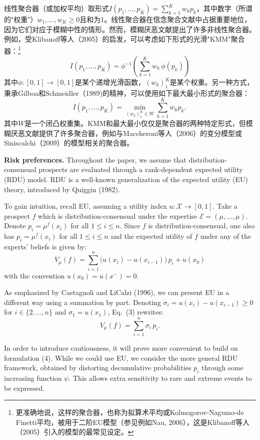 \documentclass[12pt,a4paper]{article}
\newenvironment{original}
  {\par\noindent\ignorespaces}
  {\par}
\newenvironment{translation}
  {\par\noindent{\color{transblue}\ignorespaces}}
  {\par\medskip}
\begin{document}
\begin{translation}
线性聚合器（或加权平均）取形式$I(p_{1}, \dots, p_{K}) = \sum_{k=1}^{K} w_{k} p_{k}$，其中数字（所谓的"权重"）$w_{1}, \dots, w_{K} \geq 0$且和为1。线性聚合器在信念聚合文献中占据重要地位，因为它们对应于模糊中性的情形。然而，模糊厌恶文献提出了许多非线性聚合器。例如，受Klibanoff等人（2005）的启发，可以考虑如下形式的光滑"KMM"聚合器：\footnote{更准确地说，这样的聚合器，也称为拟算术平均或Kolmogorov-Nagumo-de Finetti平均，被用于二阶EU模型（参见例如Nau, 2006），这是Klibanoff等人（2005）引入的模型的最常见设定。}
\[
I(p_{1}, \dots, p_{K}) = \phi^{-1}\!\left( \sum_{k=1}^{K} w_{k} \, \phi(p_{k}) \right) \tag{1}
\]
其中$\phi: [0,1] \to [0,1]$是某个递增光滑函数，$(w_{k})_{1}^{K}$是某个权重。另一种方式，秉承Gilboa和Schmeidler（1989)的精神，可以使用如下最大最小形式的聚合器：
\[
I(p_{1}, \dots, p_{K}) = \min_{(w_{k})_{1}^{K} \in W} \sum_{k=1}^{K} w_{k} p_{k}, \tag{2}
\]
其中$W$是一个闭凸权重集。KMM和最大最小仅仅是聚合器的两种特定形式，但模糊厌恶文献提供了许多聚合器，例如与Maccheroni等人（2006）的变分模型或Siniscalchi（2009）的模型相关的聚合器。
\end{translation}

\begin{original}
\textbf{Risk preferences.} Throughout the paper, we assume that distribution-consensual prospects are evaluated through a rank-dependent expected utility (RDU) model. RDU is a well-known generalization of the expected utility (EU) theory, introduced by Quiggin (1982).

To gain intuition, recall EU, assuming a utility index $u: \mathcal{X} \to [0,1]$. Take a prospect $f$ which is distribution-consensual under the expertise $\mathcal{E} = (\mu, \dots, \mu)$. Denote $p_{i} = \mu^{f}(x_{i})$ for all $1 \leq i \leq n$. Since $f$ is distribution-consensual, one also has $p_{i} = \mu^{f}(x_{i})$ for all $1 \leq i \leq n$ and the expected utility of $f$ under any of the experts' beliefs is given by:
\[
V_{\mu}(f) = \sum_{i=1}^{n} \big(u(x_{i}) - u(x_{i-1})\big) \, p_{i} + u(x_{0}) \tag{3}
\]
with the convention $u(x_{0}) = u(x^{-}) = 0$.

As emphasized by Castagnoli and LiCalzi (1996), we can present EU in a different way using a summation by part. Denoting $\sigma_{i} = u(x_{i}) - u(x_{i-1}) \geq 0$ for $i \in \{2, \dots, n\}$ and $\sigma_{1} = u(x_{1})$, Eq.\ (3) rewrites:
\[
V_{\mu}(f) = \sum_{i=1}^{n} \sigma_{i} \, p_{i}. \tag{4}
\]

In order to introduce cautiousness, it will prove more convenient to build on formulation (4). While we could use EU, we consider the more general RDU framework, obtained by distorting decumulative probabilities $p_{i}$ through some increasing function $\psi$. This allows extra sensitivity to rare and extreme events to be expressed.
\end{original}
\end{document}
